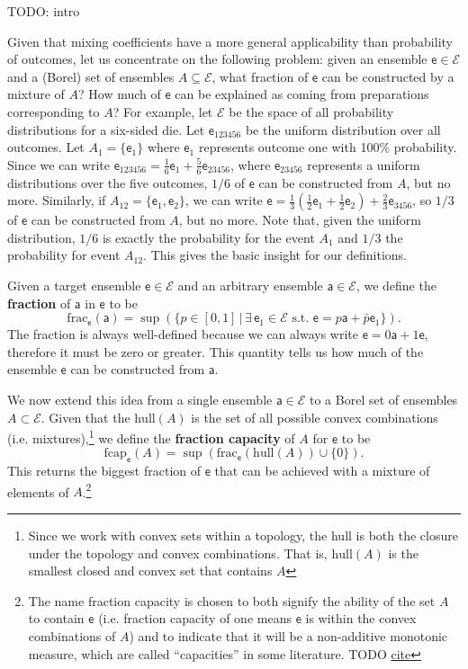 \documentclass[10pt,twocolumn, nofootinbib]{revtex4-2}
\newcommand\hull{\mathrm{hull}}
\newcommand\fraction{\mathrm{frac}}
\newcommand\frcap{\mathrm{fcap}}
\newcommand{\ens}[1][e] {\mathsf{#1}} %
\newcommand{\Ens}[1][E] {\mathcal{#1}} %
\begin{document}
TODO: intro

Given that mixing coefficients have a more general applicability than probability of outcomes, let us concentrate on the following problem: given an ensemble $\ens \in \Ens$ and a (Borel) set of ensembles $A \subseteq \Ens$, what fraction of $\ens$ can be constructed by a mixture of $A$? How much of $\ens$ can be explained as coming from preparations corresponding to $A$? For example, let $\Ens$ be the space of all probability distributions for a six-sided die. Let $\ens_{123456}$ be the uniform distribution over all outcomes. Let $A_1 = \{\ens_1\}$ where $\ens_1$ represents outcome one with 100\% probability. Since we can write $\ens_{123456} = \frac{1}{6} \ens_{1} + \frac{5}{6} \ens_{23456}$, where $\ens_{23456}$ represents a uniform distributions over the five outcomes, $1/6$ of $\ens$ can be constructed from $A$, but no more. Similarly, if $A_{12} = \{\ens_{1},\ens_{2}\}$, we can write $\ens = \frac{1}{3} \left(\frac{1}{2} \ens_1 + \frac{1}{2} \ens_2 \right)  + \frac{2}{3} \ens_{3456}$, so $1/3$ of $\ens$ can be constructed from $A$, but no more. Note that, given the uniform distribution, $1/6$ is exactly the probability for the event $A_1$ and $1/3$ the probability for event $A_{12}$. This gives the basic insight for our definitions.

Given a target ensemble $\ens \in \Ens$ and an arbitrary ensemble $\ens[a] \in \Ens$, we define the \textbf{fraction} of $\ens[a]$ in $\ens$ to be
\begin{equation}
	\fraction_{\ens}(\ens[a]) = \sup(\{ p \in [0,1] \, | \, \exists \, \ens_1 \in \Ens \text{ s.t. }  \ens = p \ens[a] + \bar{p} \ens_1 \}).
\end{equation}
The fraction is always well-defined because we can always write $\ens = 0 \ens[a] + 1 \ens$, therefore it must be zero or greater. This quantity tells us how much of the ensemble $\ens$ can be constructed from $\ens[a]$. 

We now extend this idea from a single ensemble $\ens[a] \in \Ens$ to a Borel set of ensembles $A \subset \Ens$. Given that the $\hull(A)$ is the set of all possible convex combinations (i.e. mixtures),\footnote{Since we work with convex sets within a topology, the hull is both the closure under the topology and convex combinations. That is, $\hull(A)$ is the smallest closed and convex set that contains $A$} we define the \textbf{fraction capacity} of $A$ for $\ens$ to be
\begin{equation}
	\frcap_{\ens}(A) = \sup(\fraction_{\ens}(\hull(A))\cup\{0\}).
\end{equation}
This returns the biggest fraction of $\ens$ that can be achieved with a mixture of elements of $A$.\footnote{The name fraction capacity is chosen to both signify the ability of the set $A$ to contain $\ens$ (i.e. fraction capacity of one means $\ens$ is within the convex combinations of $A$) and to indicate that it will be a non-additive monotonic measure, which are called ``capacities'' in some literature. TODO \href{ https://link.springer.com/book/10.1007/978-3-319-03155-2}{cite} }
\end{document}
